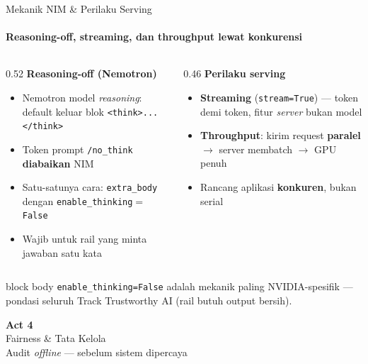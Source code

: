 \documentclass[aspectratio=169,t]{beamer}
\newcommand{\acttitle}[3]{%
  \begin{frame}[plain]
    \vspace{1.5cm}
    \begin{center}
      {\color{nvgreen}\Huge\bfseries Act #1}\\[1.2em]
      {\color{nvwhite}\Huge #2}\\[0.8em]
      {\color{nvgray}\Large #3}
    \end{center}
  \end{frame}%
}
\newcommand{\takeaway}[1]{%
  \vspace{0.3em}
  \begin{beamercolorbox}[rounded=true,shadow=false,sep=6pt]{block body}
    \centering\small\color{nvlightgreen}#1
  \end{beamercolorbox}%
}
\begin{document}
\begin{frame}{Mekanik NIM \& Perilaku Serving}
  \framesubtitle{Reasoning-off, streaming, dan throughput lewat konkurensi}
  \begin{columns}[T]
    \begin{column}{0.52\textwidth}
      \textcolor{nvorange}{\textbf{Reasoning-off (Nemotron)}}
      \begin{itemize}\footnotesize
        \item Nemotron model \emph{reasoning}: default keluar blok \texttt{<think>...</think>}
        \item Token prompt \texttt{/no\_think} \textbf{diabaikan} NIM
        \item Satu-satunya cara: \texttt{extra\_body} dengan \texttt{enable\_thinking}$=$\texttt{False}
        \item Wajib untuk rail yang minta jawaban satu kata
      \end{itemize}
    \end{column}
    \begin{column}{0.46\textwidth}
      \textcolor{nvgreen}{\textbf{Perilaku serving}}
      \begin{itemize}\footnotesize
        \item \textbf{Streaming} (\texttt{stream=True}) --- token demi token, fitur \emph{server} bukan model
        \item \textbf{Throughput}: kirim request \textbf{paralel} $\to$ server membatch $\to$ GPU penuh
        \item Rancang aplikasi \textbf{konkuren}, bukan serial
      \end{itemize}
    \end{column}
  \end{columns}
  \takeaway{\texttt{enable\_thinking=False} adalah mekanik paling NVIDIA-spesifik --- pondasi seluruh Track Trustworthy AI (rail butuh output bersih).}
\end{frame}

\acttitle{4}{Fairness \& Tata Kelola}{Audit \emph{offline} --- sebelum sistem dipercaya}
\end{document}
